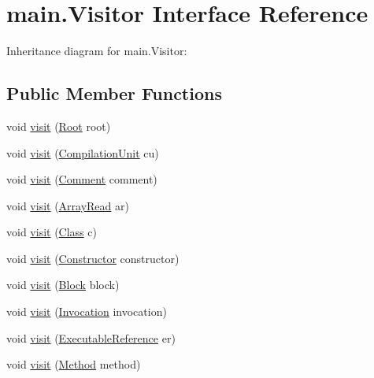 \hypertarget{interfacemain_1_1_visitor}{}\section{main.\+Visitor Interface Reference}
\label{interfacemain_1_1_visitor}


Inheritance diagram for main.\+Visitor\+:
\subsection*{Public Member Functions}
\begin{DoxyCompactItemize}
\item 
void \hyperlink{interfacemain_1_1_visitor_af0d09d0444a9a38206f55c3c4a145c64}{visit} (\hyperlink{classparser_1_1_root}{Root} root)
\item 
void \hyperlink{interfacemain_1_1_visitor_ae4526b245504b137e6493b64cf88abd8}{visit} (\hyperlink{classparser_1_1_compilation_unit}{Compilation\+Unit} cu)
\item 
void \hyperlink{interfacemain_1_1_visitor_a86506550160b7c663463a8b56aea26ac}{visit} (\hyperlink{classparser_1_1_comment}{Comment} comment)
\item 
void \hyperlink{interfacemain_1_1_visitor_a9b393467433e42eb3ef3d4dd49517d91}{visit} (\hyperlink{classparser_1_1_array_read}{Array\+Read} ar)
\item 
void \hyperlink{interfacemain_1_1_visitor_afcc74364de2b22080c15380f1d54e7c7}{visit} (\hyperlink{classparser_1_1_class}{Class} c)
\item 
void \hyperlink{interfacemain_1_1_visitor_afd5b91c54ca6bdc370d05b376d30883d}{visit} (\hyperlink{classparser_1_1_constructor}{Constructor} constructor)
\item 
void \hyperlink{interfacemain_1_1_visitor_a12e9a6a856e6048b49c0b5948dbf7a9a}{visit} (\hyperlink{classparser_1_1_block}{Block} block)
\item 
void \hyperlink{interfacemain_1_1_visitor_a573d5b4bdaf93b1ab363d2f4374e301e}{visit} (\hyperlink{classparser_1_1_invocation}{Invocation} invocation)
\item 
void \hyperlink{interfacemain_1_1_visitor_a605cf685affb3add0d2d4703e2c968e3}{visit} (\hyperlink{classparser_1_1_executable_reference}{Executable\+Reference} er)
\item 
void \hyperlink{interfacemain_1_1_visitor_a115a68630492b789c182ebeb4469d7bd}{visit} (\hyperlink{classparser_1_1_method}{Method} method)
\item 

\end{DoxyCompactItemize}
